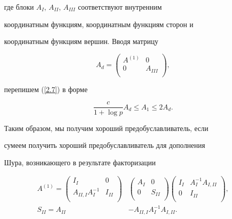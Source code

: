 где блоки $A_I$, $A_{II}$, $A_{III}$ соответствуют внутренним


координатным функциям, координатным функциям сторон и


координатным функциям вершин. Вводя матрицу


$$


A_d=


\begin{pmatrix}


A^{(1)} &0 \\


0 & A_{III} \\


\end{pmatrix},


$$


перепишем (\ref{2.7}) в форме


\begin{equation}


\frac{c}{1+\log p}A_d\le A_1\le 2A_d.


\label{3.2}


\end{equation}


Таким образом, мы получим хороший предобуславливатель, если


сумеем получить хороший предобуславливатель для дополнения


Шура, возникающего в результате факторизации


\begin{equation}


\begin{split}


A^{(1)}=


\begin{pmatrix}


I_{I} & 0 \\


A_{II,I}A_{I}^{-1} & I_{II} \\


\end{pmatrix}


&


\begin{pmatrix}


A_{I} & 0 \\ 0 & S_{II} \\


\end{pmatrix}


\begin{pmatrix}


I_{I} & A_I^{-1}A_{I,II} \\ 0 & I_{II} \\


\end{pmatrix},\\


S_{II}=A_{II}&-A_{II,I}A_I^{-1}A_{I,II}.


\label{3.3}


\end{split}


\end{equation}


